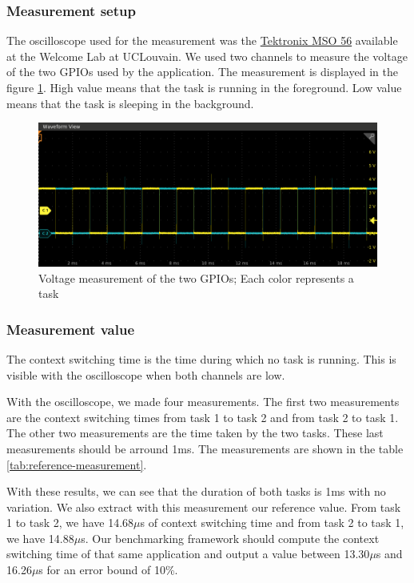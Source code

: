 \subsubsection{Measurement setup}

The oscilloscope used for the measurement was the \href{https://www.tek.com/oscilloscope/mso56}{Tektronix MSO 56} available at the Welcome Lab at UCLouvain.
We used two channels to measure the voltage of the two GPIOs used by the application.
The measurement is displayed in the figure \ref{fig:measurement-value-wave}.
High value means that the task is running in the foreground.
Low value means that the task is sleeping in the background.

\begin{figure}[!ht]
  \centering
  \includegraphics[scale=0.5]{assets/measurement-value-wave.png}
  \caption{\label{fig:measurement-value-wave}Voltage measurement of the two GPIOs; Each color represents a task}
\end{figure}

\subsubsection{Measurement value}

The context switching time is the time during which no task is running.
This is visible with the oscilloscope when both channels are low.

With the oscilloscope, we made four measurements.
The first two measurements are the context switching times from task 1 to task 2 and from task 2 to task 1.
The other two measurements are the time taken by the two tasks.
These last measurements should be arround 1ms.
The measurements are shown in the table \ref{tab:reference-measurement}.

With these results, we can see that the duration of both tasks is 1ms with no variation.
We also extract with this measurement our reference value.
From task 1 to task 2, we have 14.68$\mu$s of context switching time and from task 2 to task 1, we have 14.88$\mu$s.
Our benchmarking framework should compute the context switching time of that same application and output a value between 13.30$\mu$s and 16.26$\mu$s for an error bound of 10\%.

